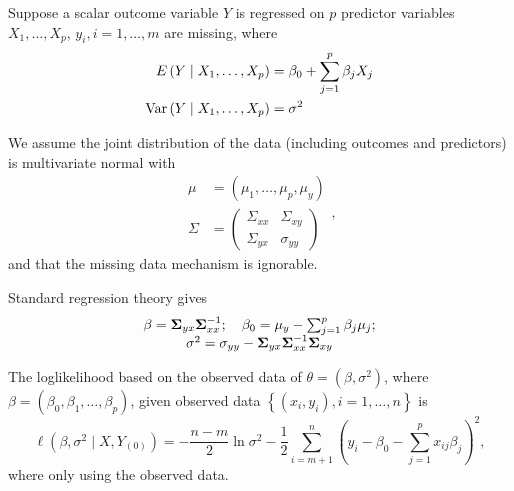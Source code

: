 \begin{example}
	Suppose a scalar outcome variable \(Y\) is regressed on \(p\) predictor variables \(X_{1},\ldots,X_{p}\), \(y_{i},i=1,\ldots,m\) are missing, where
	\begin{equation}
		\begin{aligned}
			E\left(Y \mid X_{1}, \ldots, X_{p}\right)    & =\beta_{0}+\sum_{j=1}^{p} \beta_{j} X_{j} \\
			\mathrm{Var}\left(Y \mid X_{1}, \ldots, X_{p}\right) & =\sigma^{2}
		\end{aligned}
	\end{equation}

	We assume the joint distribution of the data (including outcomes and predictors) is multivariate normal with
	\begin{equation}
		\begin{aligned}
			\mu    & =\left(\mu_{1}, \ldots, \mu_{p}, \mu_{y}\right) \\
			\Sigma & =\left(\begin{array}{ll}
					                \Sigma_{x x} & \Sigma_{x y} \\
					                \Sigma_{y x} & \sigma_{y y}
				                \end{array}\right)
		\end{aligned},
	\end{equation}
	and that the missing data mechanism is ignorable.

	Standard regression theory gives
	\begin{equation}
		\begin{array}{c}
			\beta=\boldsymbol{\Sigma}_{y x} \boldsymbol{\Sigma}_{x x}^{-1} ; \quad \beta_{0}=\mu_{y}-\sum_{j=1}^{p} \beta_{j} \mu_{j} ; \\
			\sigma^{2}=\sigma_{y y}-\boldsymbol{\Sigma}_{y x} \boldsymbol{\Sigma}_{x x}^{-1} \boldsymbol{\Sigma}_{x y}
		\end{array}
	\end{equation}

	The loglikelihood based on the observed data of \(\theta=\left(\beta,\sigma^{2}\right)\), where \(\beta=\left(\beta_{0},\beta_{1},\ldots,\beta_{p}\right)\), given observed data \(\left\{\left(x_{i},y_{i}\right),i=1,\ldots,n\right\}\) is
	\begin{equation}
		\ell(\beta, \sigma^{2} \mid X, Y_{(0)})=-\frac{n-m}{2}\ln\sigma^2-\frac{1}{2}\sum_{i=m+1}^{n}\left(y_{i}-\beta_{0}-\sum_{j=1}^{p}x_{ij}\beta_{j}\right)^2,
	\end{equation}
	where only using the observed data.


\end{example}
